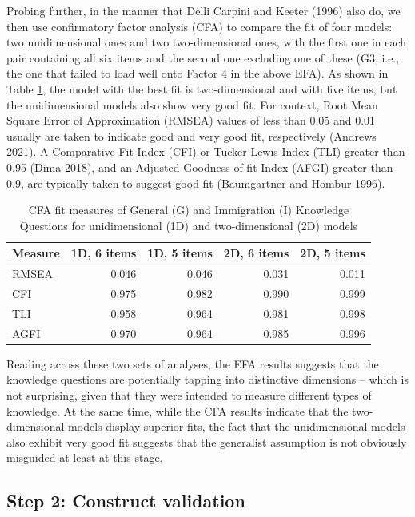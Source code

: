 \documentclass[12pt,halfline,a4paper,]{ouparticle}
\begin{document}
Probing further, in the manner that Delli Carpini and Keeter (1996) also
do, we then use confirmatory factor analysis (CFA) to compare the fit of
four models: two unidimensional ones and two two-dimensional ones, with
the first one in each pair containing all six items and the second one
excluding one of these (G3, i.e., the one that failed to load well onto
Factor 4 in the above EFA). As shown in Table \ref{tab:tab3}, the model
with the best fit is two-dimensional and with five items, but the
unidimensional models also show very good fit. For context, Root Mean
Square Error of Approximation (RMSEA) values of less than 0.05 and 0.01
usually are taken to indicate good and very good fit, respectively
(Andrews 2021). A Comparative Fit Index (CFI) or Tucker-Lewis Index
(TLI) greater than 0.95 (Dima 2018), and an Adjusted Goodness-of-fit
Index (AFGI) greater than 0.9, are typically taken to suggest good fit
(Baumgartner and Hombur 1996).

\begin{table}

\caption{\label{tab:tab3}CFA fit measures of General (G) and Immigration (I) Knowledge Questions for unidimensional (1D) and two-dimensional (2D) models}
\centering
\begin{tabular}[t]{lrrrr}
\toprule
Measure & 1D, 6 items & 1D, 5 items & 2D, 6 items & 2D, 5 items\\
\midrule
RMSEA & 0.046 & 0.046 & 0.031 & 0.011\\
CFI & 0.975 & 0.982 & 0.990 & 0.999\\
TLI & 0.958 & 0.964 & 0.981 & 0.998\\
AGFI & 0.970 & 0.964 & 0.985 & 0.996\\
\bottomrule
\end{tabular}
\end{table}

Reading across these two sets of analyses, the EFA results suggests that
the knowledge questions are potentially tapping into distinctive
dimensions -- which is not surprising, given that they were intended to
measure different types of knowledge. At the same time, while the CFA
results indicate that the two-dimensional models display superior fits,
the fact that the unidimensional models also exhibit very good fit
suggests that the generalist assumption is not obviously misguided at
least at this stage.

\hypertarget{step-2-construct-validation}{%
\subsection{Step 2: Construct
validation}\label{step-2-construct-validation}}
\end{document}
